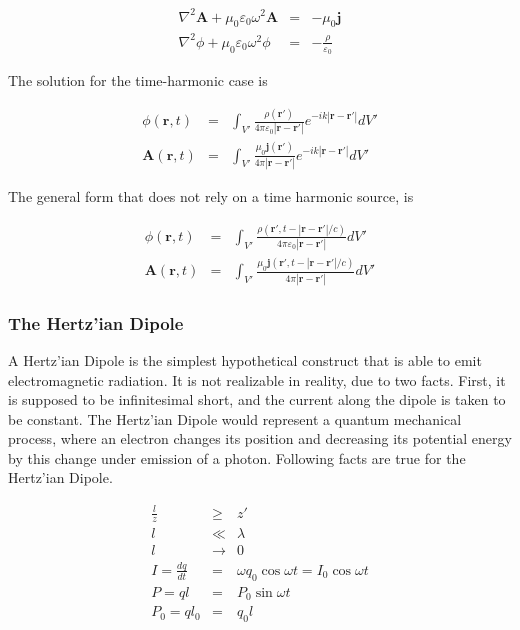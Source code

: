 \documentclass[a4paper,11pt]{report}
\begin{document}
\begin{eqnarray}
\nabla^2 \mathbf{A} + \mu_0 \varepsilon_0 \omega^2 \mathbf{A}&=& -\mu_0 \mathbf{j} \label{HH1}\\
\nabla^2 \phi + \mu_0 \varepsilon_0 \omega^2 \phi  &=&-\frac{\rho }{\varepsilon_0 } \label{HH2}
\end{eqnarray}

The solution for the time-harmonic case is

\begin{eqnarray}
\phi (\mathbf{r},t) &=& \int_{V'} \frac{\rho ( \mathbf{r}' )}{4 \pi \varepsilon_0 |\mathbf{r} - \mathbf{r}'| } e^{-ik|\mathbf{r} - \mathbf{r}'| } dV' \label{dynamicharmonicsolution1}\\
 \mathbf{A}(\mathbf{r},t) &=& \int_{V'} \frac{\mu_0 \mathbf{j} ( \mathbf{r}' )}{4 \pi  |\mathbf{r} - \mathbf{r}'| \label{dynamicharmonicsolution2}} e^{-ik|\mathbf{r} - \mathbf{r}'| } dV'
 \end{eqnarray}


The general form that does not rely on a time harmonic source, is

\begin{eqnarray}
\phi (\mathbf{r},t) &=& \int_{V'} \frac{\rho ( \mathbf{r}', t-|\mathbf{r} - \mathbf{r}'| /c  )}{4 \pi \varepsilon_0 |\mathbf{r} - \mathbf{r}'| } dV' \label{dynamicsolution1}\\
 \mathbf{A}(\mathbf{r},t) &=& \int_{V'} \frac{\mu_0 \mathbf{j} ( \mathbf{r}', t-|\mathbf{r} - \mathbf{r}'| /c  )}{4 \pi  |\mathbf{r} - \mathbf{r}'| \label{dynamicsolution2}}  dV'
 \end{eqnarray}

\subsubsection{The Hertz'ian Dipole}
A Hertz'ian Dipole is the simplest hypothetical construct that is able to emit electromagnetic radiation. It is not realizable in reality, due to two facts. First, it is supposed to be infinitesimal short, and the current along the dipole is taken to be constant. The Hertz'ian Dipole would represent a quantum mechanical process, where an electron changes its position and decreasing its potential energy by this change under emission of a photon. Following facts are true for the Hertz'ian Dipole.


\begin{eqnarray}
\frac{l}{z} &\geq& z' \label{hd1} \\
l &\ll& \lambda \label{hd2} \\
l &\rightarrow& 0 \label{hd3} \\
I=\frac{dq}{dt} &=& \omega q_0 \cos{\omega t} = I_0 \cos{\omega t} \label{hd4} \\
P=ql &=& P_0 \sin{\omega t}  \label{hd5} \\
P_0=ql_0 &=& q_0 l \label{hd6}
\end{eqnarray}
\end{document}
